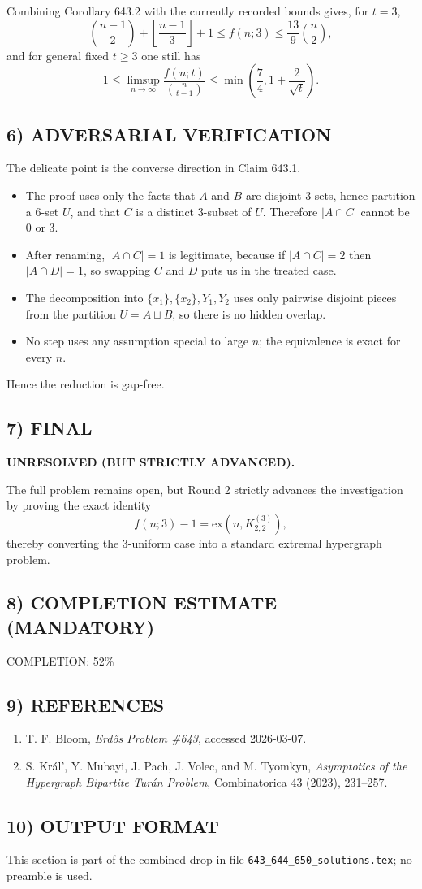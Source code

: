 Combining Corollary 643.2 with the currently recorded bounds gives, for $t=3$,
\[
\binom{n-1}{2}+\left\lfloor\frac{n-1}{3}\right\rfloor+1
\le f(n;3)
\le \frac{13}{9}\binom{n}{2},
\]
and for general fixed $t\ge 3$ one still has
\[
1\le \limsup_{n\to\infty}\frac{f(n;t)}{\binom{n}{t-1}}
\le \min\!\left(\frac{7}{4},1+\frac{2}{\sqrt t}\right).
\]

\subsection*{6) ADVERSARIAL VERIFICATION}
The delicate point is the converse direction in Claim 643.1.

\begin{itemize}
\item The proof uses only the facts that $A$ and $B$ are disjoint $3$-sets, hence partition a $6$-set $U$, and that $C$ is a distinct $3$-subset of $U$.  Therefore $|A\cap C|$ cannot be $0$ or $3$.
\item After renaming, $|A\cap C|=1$ is legitimate, because if $|A\cap C|=2$ then $|A\cap D|=1$, so swapping $C$ and $D$ puts us in the treated case.
\item The decomposition into $\{x_1\},\{x_2\},Y_1,Y_2$ uses only pairwise disjoint pieces from the partition $U=A\sqcup B$, so there is no hidden overlap.
\item No step uses any assumption special to large $n$; the equivalence is exact for every $n$.
\end{itemize}

Hence the reduction is gap-free.

\subsection*{7) FINAL}
\textbf{UNRESOLVED (BUT STRICTLY ADVANCED).}

The full problem remains open, but Round 2 strictly advances the investigation by proving the exact identity
\[
 f(n;3)-1 = \mathrm{ex}(n,K^{(3)}_{2,2}),
\]
thereby converting the $3$-uniform case into a standard extremal hypergraph problem.

\subsection*{8) COMPLETION ESTIMATE (MANDATORY)}
COMPLETION: 52\%

\subsection*{9) REFERENCES}
\begin{enumerate}
\item T. F. Bloom, \emph{Erd\H{o}s Problem \#643}, accessed 2026-03-07.
\item S. Kr\'al', Y. Mubayi, J. Pach, J. Volec, and M. Tyomkyn, \emph{Asymptotics of the Hypergraph Bipartite Tur\'an Problem}, Combinatorica 43 (2023), 231--257.
\end{enumerate}

\subsection*{10) OUTPUT FORMAT}
This section is part of the combined drop-in file \texttt{643\_644\_650\_solutions.tex}; no preamble is used.



